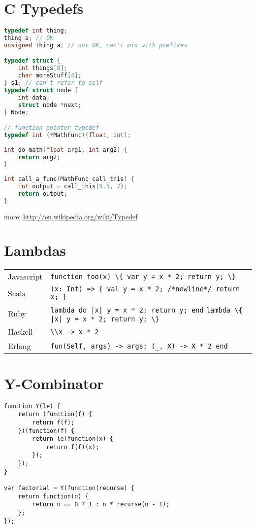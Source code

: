 \documentclass{article}
\begin{document}
\section{C Typedefs}
\begin{lstlisting}[language=C]
typedef int thing;
thing a; // OK
unsigned thing a; // not OK, can't mix with prefixes

typedef struct {
	int things[8];
	char moreStuff[4];
} s1; // can't refer to self
typedef struct node {
	int data;
	struct node *next;
} Node;

// function pointer typedef
typedef int (*MathFunc)(float, int);
 
int do_math(float arg1, int arg2) {
    return arg2;
}
 
int call_a_func(MathFunc call_this) {
    int output = call_this(5.5, 7);
    return output;
}
\end{lstlisting}
more: \url{http://en.wikipedia.org/wiki/Typedef}

\section{Lambdas}
\begin{longtabu} to 0.75\linewidth { X X }
	Javascript & \lstinline$function foo(x) \{ var y = x * 2; return y; \}$ \\
	Scala & \lstinline$(x: Int) => { val y = x * 2; /*newline*/ return x; }$ \\
	Ruby & \lstinline$lambda do |x| y = x * 2; return y; end$ \newline \lstinline$lambda \{ |x| y = x * 2; return y; \}$ \\
	Haskell & \lstinline$\\x -> x * 2$ \\
	Erlang & \lstinline$fun(Self, args) -> args; (_, X) -> X * 2 end$
\end{longtabu}

\section{Y-Combinator}
\begin{lstlisting}
function Y(le) {
    return (function(f) {
        return f(f);
    })(function(f) {
        return le(function(x) {
            return f(f)(x);
        });
    });
}

var factorial = Y(function(recurse) {
    return function(n) {
        return n == 0 ? 1 : n * recurse(n - 1);
    };
});
\end{lstlisting}
\end{document}
